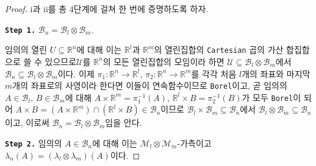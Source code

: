 \begin{proof}
    i과 ii를 총 4단계에 걸쳐 한 번에 증명하도록 하자.

    \noindent\texttt{\textbf{Step 1.}} $\mathcal{B}_n=\mathcal{B}_l\otimes\mathcal{B}_m$.

    임의의 열린 $U\subseteq\mathbb{R}^n$에 대해 이는 $\mathbb{R}^l$과 $\mathbb{R}^m$의 열린집합의 \texttt{Cartesian} 곱의 가산 합집합으로 쓸 수 있으므로\footnotemark $\mathcal{U}$를 $\mathbb{R}^n$의 모든 열린집합의 모임이라 하면 $\mathcal{U}\subseteq\mathcal{B}_l\otimes\mathcal{B}_m$에서 $\mathcal{B}_n\subseteq\mathcal{B}_l\otimes\mathcal{B}_m$이다. 이제 $\pi_1:\mathbb{R}^n\to\mathbb{R}^l,\,\pi_2:\mathbb{R}^n\to\mathbb{R}^m$를 각각 처음 $l$개의 좌표와 마지막 $m$개의 좌표로의 사영이라 한다면 이들이 연속함수이므로 \texttt{Borel}이고, 곧 임의의 $A\in\mathcal{B}_l,\,B\in\mathcal{B}_m$에 대해 $A\times\mathbb{R}^m=\pi_1^{-1}(A),\,\mathbb{R}^l\times B=\pi_2^{-1}(B)$가 모두 \texttt{Borel}이 되어 $A\times B=(A\times\mathbb{R}^m)\cap(\mathbb{R}^l\times B)\in\mathcal{B}_n$이므로 $\mathcal{B}_l\times\mathcal{B}_m\subseteq\mathcal{B}_n$에서 $\mathcal{B}_l\otimes\mathcal{B}_m\subseteq\mathcal{B}_n$이고, 이로써 $\mathcal{B}_n=\mathcal{B}_l\otimes\mathcal{B}_m$임을 안다.

    \noindent\texttt{\textbf{Step 2.}} 임의의 $A\in\mathcal{B}_n$에 대해 이는 $\mathcal{M}_l\otimes\mathcal{M}_m$-가측이고 $\lambda_n(A)=(\lambda_l\otimes\lambda_m)(A)$이다.


\end{proof}
